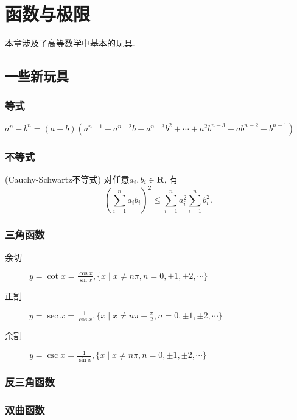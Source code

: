 \section{函数与极限}

本章涉及了高等数学中基本的玩具.

\subsection{一些新玩具}
\subsubsection{等式}
\(a^n-b^n=(a-b)(a^{n-1}+a^{n-2}b+a^{n-3}b^2+\cdots+a^2b^{n-3}+ab^{n-2}+b^{n-1})\)

\subsubsection{不等式}
(Cauchy-Schwartz不等式) 对任意\(a_i,b_i\in\mathbf{R}\), 有
\[\left(\sum_{i=1}^na_ib_i\right)^2\le\sum_{i=1}^na_i^2\sum_{i=1}^nb_i^2.\]

\subsubsection{三角函数}
\begin{description}
\item[余切] \(\displaystyle y=\cot x=\frac{\cos x}{\sin x},\{x\mid x\ne n\pi,n=0,\pm 1,\pm 2,\cdots\}\)
\item[正割] \(\displaystyle y=\sec x=\frac{1}{\cos x},\{x\mid x\ne n\pi+\frac{\pi}{2},n=0,\pm 1,\pm 2,\cdots\}\)
\item[余割] \(\displaystyle y=\csc x=\frac{1}{\sin x},\{x\mid x\ne n\pi,n=0,\pm 1,\pm 2,\cdots\}\)
\end{description}

\subsubsection{反三角函数}

\subsubsection{双曲函数}

